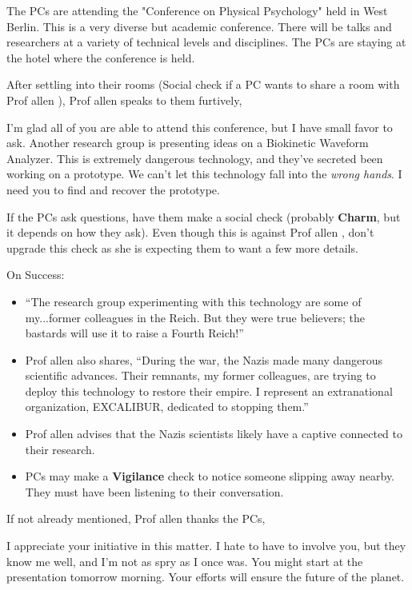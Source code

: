 \documentclass{book}
\newcommand{\df}{\difficulty}
\newcommand{\prof}{
    {\color{brown} Prof allen}
}
\begin{document}
\begin{multicols*}{2}
The PCs are attending the "Conference on Physical Psychology" held in West Berlin.  This is a very diverse but academic conference.  There will be talks and researchers at a variety of technical levels and disciplines.  The PCs are staying at the hotel where the conference is held.

After settling into their rooms (\df\df Social check if a PC wants to share a room with \prof), \prof speaks to them furtively,

\begin{quoting}
    I'm glad all of you are able to attend this conference, but I have small favor to ask.  Another research group is presenting ideas on a Biokinetic Waveform Analyzer.  This is extremely dangerous technology, and they've secreted been working on a prototype.  We can't let this technology fall into the \emph{wrong hands}.  I need you to find and recover the prototype.
\end{quoting}

If the PCs ask questions, have them make a \df\df social check (probably \textbf{Charm}, but it depends on how they ask).  Even though this is against \prof, don't upgrade this check as she is expecting them to want a few more details.

On Success:
\begin{itemize}
    \item ``The research group experimenting with this technology are some of my...former colleagues in the Reich.  But they were true believers; the bastards will use it to raise a Fourth Reich!''
    \item \advantage \prof also shares, ``During the war, the Nazis made many dangerous scientific advances.  Their remnants, my former colleagues, are trying to deploy this technology to restore their empire.  I represent an extranational organization, EXCALIBUR, dedicated to stopping them.''
    \item \triumph \prof advises that the Nazis scientists likely have a captive connected to their research.
    \item \threat\threat PCs may make a \df\df \textbf{Vigilance} check to notice someone slipping away nearby.  They must have been listening to their conversation.
\end{itemize}

If not already mentioned, \prof thanks the PCs,

\begin{quoting}
    I appreciate your initiative in this matter.  I hate to have to involve you, but they know me well, and I'm not as spry as I once was.  You might start at the presentation tomorrow morning.  Your efforts will ensure the future of the planet.
\end{quoting}


\end{multicols*}
\end{document}
